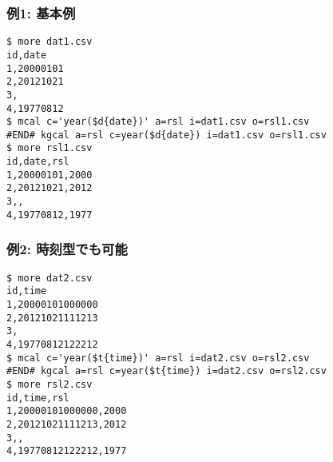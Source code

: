 \subsubsection*{例1: 基本例}



\begin{Verbatim}[baselinestretch=0.7,frame=single]
$ more dat1.csv
id,date
1,20000101
2,20121021
3,
4,19770812
$ mcal c='year($d{date})' a=rsl i=dat1.csv o=rsl1.csv
#END# kgcal a=rsl c=year($d{date}) i=dat1.csv o=rsl1.csv
$ more rsl1.csv
id,date,rsl
1,20000101,2000
2,20121021,2012
3,,
4,19770812,1977
\end{Verbatim}
\subsubsection*{例2: 時刻型でも可能}



\begin{Verbatim}[baselinestretch=0.7,frame=single]
$ more dat2.csv
id,time
1,20000101000000
2,20121021111213
3,
4,19770812122212
$ mcal c='year($t{time})' a=rsl i=dat2.csv o=rsl2.csv
#END# kgcal a=rsl c=year($t{time}) i=dat2.csv o=rsl2.csv
$ more rsl2.csv
id,time,rsl
1,20000101000000,2000
2,20121021111213,2012
3,,
4,19770812122212,1977
\end{Verbatim}
